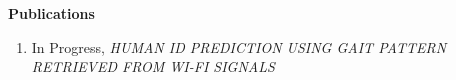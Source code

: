 {\huge \textbf{Publications}}
\begin{enumerate}

    \item In Progress, \emph{HUMAN ID PREDICTION USING GAIT
PATTERN RETRIEVED FROM WI-FI
SIGNALS } 




   
   
\end{enumerate}

